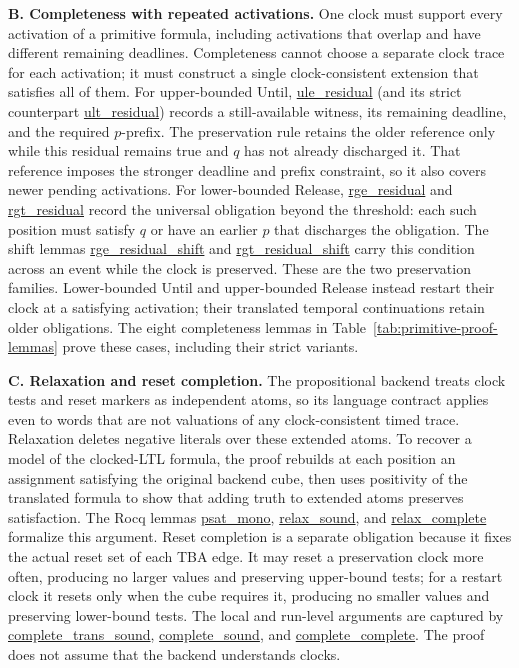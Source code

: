 \documentclass[10pt,journal,compsoc]{IEEEtran}
\newcommand{\runinhead}[1]{\par\smallskip\noindent\textbf{#1}\enspace}
\newcommand{\Rocqid}[1]{{\small\url{#1}}}
\begin{document}
\runinhead{B. Completeness with repeated activations.}
One clock must support every activation of a primitive formula, including
activations that overlap and have different remaining deadlines. Completeness
cannot choose a separate clock trace for each activation; it must construct a
single clock-consistent extension that satisfies all of them. For upper-bounded
Until, \Rocqid{ule_residual} (and its strict counterpart
\Rocqid{ult_residual}) records a still-available witness, its remaining
deadline, and the required $p$-prefix. The preservation rule retains the
older reference only while this residual remains true and $q$ has not already
discharged it. That reference imposes the stronger deadline and prefix
constraint, so it also covers newer pending activations. For lower-bounded
Release, \Rocqid{rge_residual} and \Rocqid{rgt_residual} record the universal
obligation beyond the threshold: each such position must satisfy $q$ or have
an earlier $p$ that discharges the obligation. The shift lemmas
\Rocqid{rge_residual_shift} and \Rocqid{rgt_residual_shift} carry this
condition across an event while the clock is preserved. These are the two
preservation families. Lower-bounded Until and upper-bounded Release instead
restart their clock at a satisfying activation; their translated temporal
continuations retain older obligations. The eight completeness lemmas in
Table~\ref{tab:primitive-proof-lemmas} prove these cases, including their
strict variants.

\runinhead{C. Relaxation and reset completion.}
The propositional backend treats clock tests and reset markers as independent
atoms, so its language contract applies even to words that are not valuations
of any clock-consistent timed trace. Relaxation deletes negative literals
over these extended atoms. To recover a model of the clocked-LTL formula, the
proof rebuilds at each position an assignment satisfying the original backend cube, then
uses positivity of the translated formula to show that adding truth to
extended atoms preserves satisfaction. The Rocq lemmas \Rocqid{psat_mono},
\Rocqid{relax_sound}, and \Rocqid{relax_complete} formalize this argument.
Reset completion is a separate obligation because it fixes the actual reset
set of each TBA edge. It may reset a preservation clock more often, producing
no larger values and preserving upper-bound tests; for a restart clock it
resets only when the cube requires it, producing no smaller values and
preserving lower-bound tests. The local and run-level arguments are captured
by \Rocqid{complete_trans_sound}, \Rocqid{complete_sound}, and
\Rocqid{complete_complete}. The proof does not assume that the backend
understands clocks.
\end{document}
